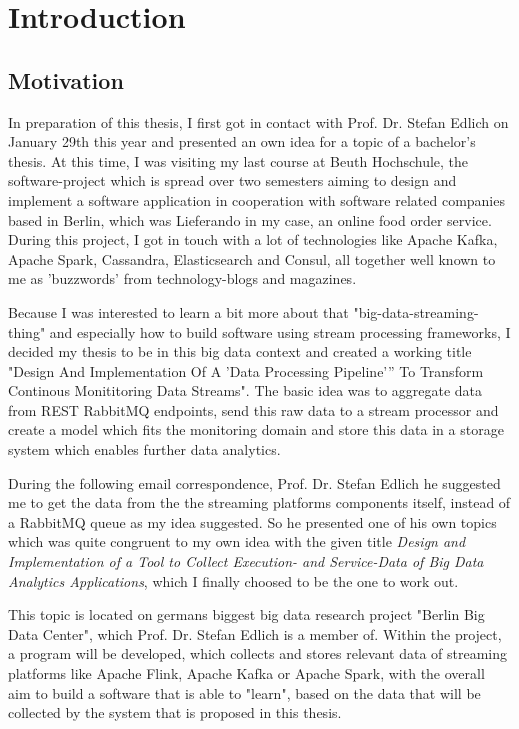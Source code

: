 \chapter{Introduction}

\section{Motivation}

In preparation of this thesis, I first got in contact with Prof. Dr. Stefan Edlich on January 29th
this year and presented an own idea for a topic of a bachelor's thesis. At this time, I was
visiting my last course at Beuth Hochschule, the software-project which is spread over two semesters
aiming to design and implement a software application in cooperation with software related companies
based in Berlin, which was Lieferando in my case, an online food order service. During this project,
I got in touch with a lot of technologies like Apache Kafka, Apache Spark, Cassandra, Elasticsearch
and Consul, all together well known to me as 'buzzwords' from technology-blogs and magazines.

Because I was interested to learn a bit more about that "big-data-streaming-thing" and especially how
to build software using stream processing frameworks, I decided my thesis to be in this big data context
and created a working title "Design And Implementation Of A 'Data Processing Pipeline'” To Transform
Continous Monititoring Data Streams". The basic idea was to aggregate data from REST RabbitMQ endpoints,
send this raw data to a stream processor and create a model which fits the monitoring domain and store
this data in a storage system which enables further data analytics.

During the following email correspondence, Prof. Dr. Stefan Edlich he suggested me to get the data
from the the streaming platforms components itself, instead of a RabbitMQ queue as my idea suggested.
So he presented one of his own topics which was quite congruent to my own idea with the given title
\textit{Design and Implementation of a Tool to Collect Execution- and Service-Data of Big Data Analytics
Applications}, which I finally choosed to be the one to work out.

This topic is located on germans biggest big data research project "Berlin Big Data Center", which
Prof. Dr. Stefan Edlich is a member of. Within the project, a program will be developed, which collects
and stores relevant data of streaming platforms like Apache Flink, Apache Kafka or Apache Spark,
with the overall aim to build a software that is able to "learn", based on the data that
will be collected by the system that is proposed in this thesis.

